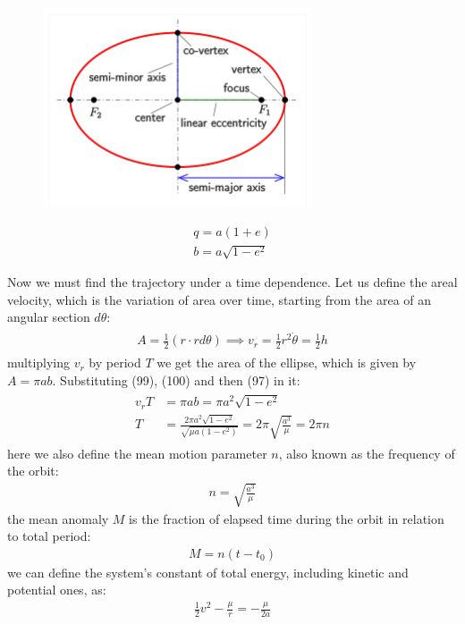 \documentclass[12pt,a4paper]{article}
\begin{document}
\begin{figure}
\includegraphics[scale=0.9]{6}
\end{figure}
\begin{align}
    q=a(1+e) \\
    b=a\sqrt{1-e^2}
\end{align}

Now we must find the trajectory under a time dependence. Let us define the areal velocity, which is the variation of area over time, starting from the area of an angular section $d\theta$:
\begin{align}
\begin{split}
    A=\frac{1}{2}(r\cdot r d\theta) \implies v_r=\frac{1}{2}r^2 \dot{\theta}=\frac{1}{2}h
\end{split}
\end{align}
multiplying $v_r$ by period $T$ we get the area of the ellipse, which is given by $A=\pi ab$. Substituting (99), (100) and then (97) in it:
\begin{align}
\begin{split}
    v_rT&=\pi ab=\pi a^2\sqrt{1-e^2} \\
    T&=\frac{2\pi a^2\sqrt{1-e^2}}{\sqrt{\mu a(1-e^2)}}=2\pi\sqrt{\frac{a^3}{\mu}}=2\pi n
\end{split}
\end{align}
here we also define the mean motion parameter $n$, also known as the frequency of the orbit:
\begin{align}
    n=\sqrt{\frac{a^3}{\mu}}
\end{align}
the mean anomaly $M$ is the fraction of elapsed time during the orbit in relation to total period:
\begin{align}
    M=n(t-t_0)
\end{align}
we can define the system's constant of total energy, including kinetic and potential ones, as:
\begin{align}
    \frac{1}{2}v^2-\frac{\mu}{r}=-\frac{\mu}{2a}
\end{align}
\end{document}
